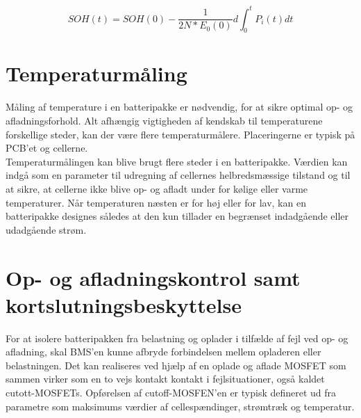 \begin {equation} 
SOH(t) = SOH(0) - \frac{1}{2N*E_{0}(0)}d \int_{0}^{t} P_{i}(t)dt
\end {equation}




\section{Temperaturmåling}
Måling af temperature i en batteripakke er nødvendig, for at sikre optimal op- og afladningsforhold. Alt afhængig vigtigheden af kendskab til temperaturene forskellige steder, kan der være flere temperaturmålere. Placeringerne er typisk på PCB'et og cellerne.
\\

Temperaturmålingen kan blive brugt flere steder i en batteripakke. Værdien kan indgå som en parameter til udregning af cellernes helbredsmæssige tilstand og til at sikre, at cellerne ikke blive op- og afladt under for kølige eller varme temperaturer. Når temperaturen næsten er for høj eller for lav, kan en batteripakke designes således at den kun tillader en begrænset indadgående eller udadgående strøm.

\section{Op- og afladningskontrol samt kortslutningsbeskyttelse}
For at isolere batteripakken fra belastning og oplader i tilfælde af fejl ved op- og afladning, skal BMS'en kunne afbryde forbindelsen mellem opladeren eller belastningen. Det kan realiseres ved hjælp af en oplade og aflade MOSFET som sammen virker som en to vejs kontakt kontakt i fejlsituationer, også kaldet cutott-MOSFETs. Opførelsen af cutoff-MOSFEN'en er typisk defineret ud fra parametre som maksimums værdier af cellespændinger, strømtræk og temperatur. 
\
